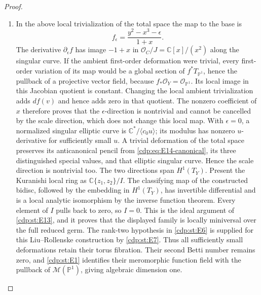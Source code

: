\begin{proof}
\begin{enumerate}[label=\arabic*.,leftmargin=*]
\item In the above local trivialization
of the total space the map to the base is
\[
 f_{\epsilon}=\frac{y^2-x^3-\epsilon}{1+x}.
\]
The derivative $\partial_\epsilon f$ has image $-1+x$ in
$\mathcal O_C/J=\mathbb C[x]/(x^2)$ along the singular curve.
If the ambient first-order deformation were trivial, every
first-order variation of its map would be a global section of
$f^*T_{\mathbb P^1}$, hence the pullback of a projective vector
field, because $f_*\mathcal O_Y=\mathcal O_{\mathbb P^1}$.
Its local image in this Jacobian quotient is constant. Changing
the local ambient trivialization adds $df(v)$ and hence adds
zero in that quotient. The nonzero coefficient of $x$ therefore
proves that the $\epsilon$-direction is nontrivial and cannot be
cancelled by the scale direction, which does not change this local
map. With $\epsilon=0$, a normalized singular elliptic curve is
$\mathbb C^*/\langle c_0u\rangle$; its modulus has nonzero
$u$-derivative for sufficiently small $u$. A trivial deformation
of the total space preserves its anticanonical pencil from
\eqref{cdp:eq:E14-canonical}, its three distinguished special values,
and that elliptic singular curve. Hence the scale direction is
nontrivial too. The two directions span $H^1(T_Y)$.
Present the Kuranishi local ring as
$\mathbb C\{z_1,z_2\}/I$. The classifying map of the constructed
bidisc, followed by the embedding in $H^1(T_Y)$, has invertible
differential and is a local analytic isomorphism by the inverse
function theorem. Every element of $I$ pulls back to zero, so $I=0$.
This is the ideal argument of \ref{cdp:st:E13}, and it proves that
the displayed family is locally miniversal over the full reduced germ.
The rank-two hypothesis in \ref{cdp:st:E6} is supplied for this
Liu--Rollenske construction by \ref{cdp:st:E7}. Thus all sufficiently
small deformations retain their torus fibration.
Their second Betti number remains zero, and \ref{cdp:st:E1}
identifies their meromorphic function field with the pullback of
$\mathcal M(\mathbb P^1)$, giving algebraic dimension one.

\end{enumerate}
\end{proof}
